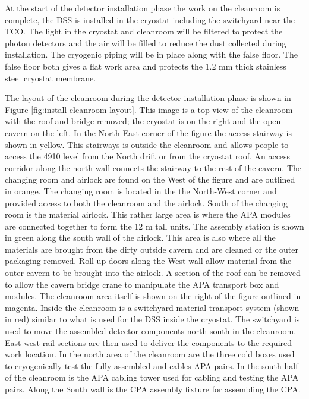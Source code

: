 At the start of the detector installation phase the work on the cleanroom is complete, the DSS is installed in the cryostat including the switchyard near the TCO. 
The light in the cryostat and cleanroom will be filtered to protect the photon detectors and the air will be filled to reduce the dust collected during installation. 
The cryogenic piping will be in place along with the false floor. 
The false floor both gives a flat work area and protects the 1.2 \si{mm} thick stainless steel cryostat membrane. 

The layout of the cleanroom during the detector installation phase is shown in Figure \ref{fig:install-cleanroom-layout}. This image is a top view of the cleanroom with the roof and bridge removed; the cryostat is on the right and the open cavern on the left. In the North-East corner of the figure the access stairway is shown in yellow. This stairways is outside the cleanroom and allows people to access the 4910 level from the North drift or from the cryostat roof. An access corridor along the north wall connects the stairway to the rest of the cavern. The changing room and airlock are found on the West of the figure and are outlined in orange. The changing room is located in the the North-West corner and provided access to both the cleanroom and the airlock. South of the changing room is the material airlock. This rather large area is where the APA modules are connected together to form the 12 \si{m} tall units. The assembly station is shown in green along the south wall of the airlock. This area is also where all the materials are brought from the dirty outside cavern and are cleaned or the outer packaging removed. Roll-up doors along the West wall allow material from the outer cavern to be brought into the airlock. A section of the roof can be removed to allow the cavern bridge crane to manipulate the APA transport box and modules. The cleanroom area itself is shown on the right of the figure outlined in magenta. Inside the cleanroom is a switchyard material transport system (shown in red) similar to what is used for the DSS inside the cryostat. The switchyard is used to move the assembled detector components north-south in the cleanroom. East-west rail sections are then used to deliver the components to the required work location. In the north area of the cleanroom are the three cold boxes used to cryogenically test the fully assembled and cables APA pairs. In the south half of the cleanroom is the APA cabling tower used for cabling and testing the APA pairs. Along the South wall is the CPA assembly fixture for assembling the CPA. 

